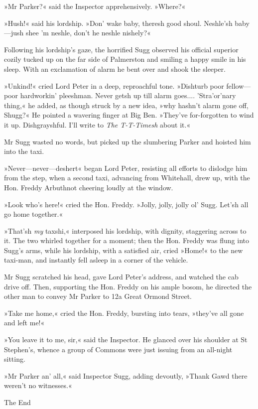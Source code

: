 »Mr Parker?« said the Inspector apprehensively. »Where?«

»Hush!« said his lordship. »Don' wake baby, theresh good shoul.  Neshle'sh baby—jush shee 'm neshle, don't he neshle nishely?«

Following his lordship's gaze, the horrified Sugg observed his official superior cozily tucked up on the far side of Palmerston and smiling a happy smile in his sleep. With an exclamation of alarm he bent over and shook the sleeper.

»Unkind!« cried Lord Peter in a deep, reproachful tone. »Dishturb poor fellow—poor hardworkin' pleeshman. Never getsh up till alarm goes....  'Stra'or'nary thing,« he added, as though struck by a new idea, »why hashn't alarm gone off, Shugg?« He pointed a wavering finger at Big Ben. »They've for-forgotten to wind it up. Dishgrayshful. I'll write to \textit{The T-T-Timesh} about it.«

Mr Sugg wasted no words, but picked up the slumbering Parker and hoisted him into the taxi.

»Never—never—deshert\longdash« began Lord Peter, resisting all efforts to dislodge him from the step, when a second taxi, advancing from Whitehall, drew up, with the Hon. Freddy Arbuthnot cheering loudly at the window.

»Look who's here!« cried the Hon. Freddy. »Jolly, jolly, jolly ol' Sugg. Let'sh all go home together.«

»That'sh \textit{my} taxshi,« interposed his lordship, with dignity, staggering across to it. The two whirled together for a moment; then the Hon. Freddy was flung into Sugg's arms, while his lordship, with a satisfied air, cried »Home!« to the new taxi-man, and instantly fell asleep in a corner of the vehicle.

Mr Sugg scratched his head, gave Lord Peter's address, and watched the cab drive off. Then, supporting the Hon. Freddy on his ample bosom, he directed the other man to convey Mr Parker to 12a Great Ormond Street.

»Take me home,« cried the Hon. Freddy, bursting into tears, »they've all gone and left me!«

»You leave it to me, sir,« said the Inspector. He glanced over his shoulder at St Stephen's, whence a group of Commons were just issuing from an all-night sitting.

»Mr Parker an' all,« said Inspector Sugg, adding devoutly, »Thank Gawd there weren't no witnesses.«
\vfill

\begin{center}\mytitlefont\reasonablyhuge
	The End
\end{center}